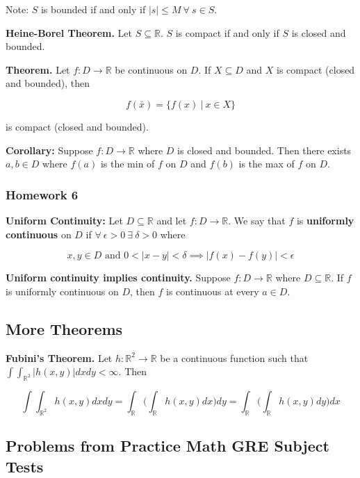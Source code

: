 Note: \(S\) is bounded if and only if \(|s| \leq M\  \forall \ s \in S \).

\textbf{Heine-Borel Theorem.} Let \(S \subseteq \mathbb{R}\). \(S\) is compact if and only if \(S\) is closed and bounded.


\textbf{Theorem.} Let \(f: D \to \mathbb{R}\) be continuous on \(D\). If \(X \subseteq D\) and \(X\) is compact (closed and bounded), then

\[
f(\bar{x}) = \{f(x) \ | \ x \in X\}
\]

is compact (closed and bounded).

\textbf{Corollary:} Suppose \(f: D \to \mathbb{R}\) where \(D\) is closed and bounded. Then there exists \(a, b \in D\) where \(f(a)\) is the min of \(f\) on \(D\) and \(f(b)\) is the max of \(f\) on \(D\).

\subsubsection{Homework 6}

\textbf{Uniform Continuity:} Let \(D \subseteq \mathbb{R}\) and let \(f: D \to \mathbb{R}\). We say that \(f\) is \textbf{uniformly continuous} on \(D\) if \(\forall \ \epsilon > 0 \ \exists \ \delta > 0\) where

\[
x, y \in D \text{ and } 0 < |x - y| < \delta \implies |f(x) - f(y)| < \epsilon
\]

\textbf{Uniform continuity implies continuity.} Suppose \(f:D \to \mathbb{R}\) where \(D \subseteq \mathbb{R}\). If \(f\) is uniformly continuous on \(D\), then \(f\) is continuous at every \(a \in D\).

\subsection{More Theorems}

\begin{theorem}\label{ra.fubini} \textbf{Fubini's Theorem.} Let \(h: \mathbb{R}^2 \to \mathbb{R}\) be a continuous function such that \(\int \int_{\mathbb{R}^2}|h(x,y)| dxdy < \infty\). Then

\[
\int \int_{\mathbb{R}^2} h(x,y)dxdy = \int_{\mathbb{R}} \bigg( \int_{\mathbb{R} } h(x,y)dx \bigg) dy = \int_{\mathbb{R}} \bigg( \int_{\mathbb{R}} h(x,y)dy \bigg) dx
\]

\end{theorem}

\subsection{Problems from Practice Math GRE Subject Tests}

